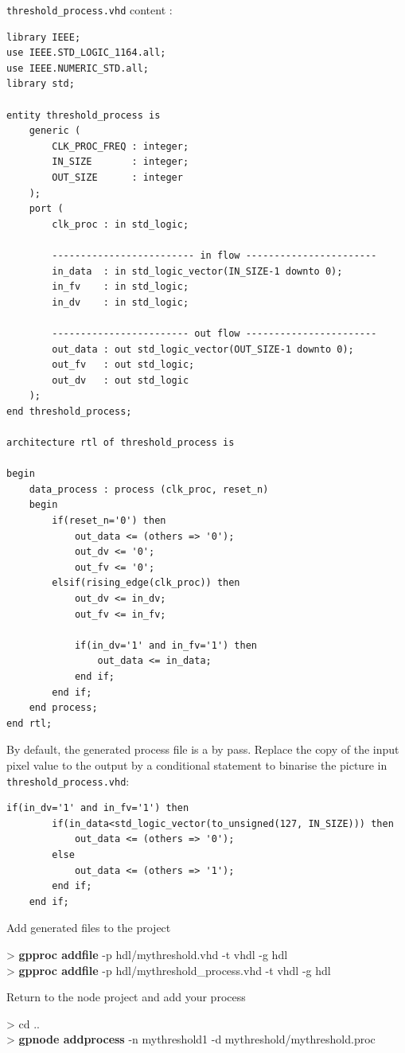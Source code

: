 \documentclass[10pt,a4paper]{article}
\begin{document}
\texttt{threshold\_process.vhd} content :
\begin{lstlisting}[frame=single]
library IEEE;
use IEEE.STD_LOGIC_1164.all;
use IEEE.NUMERIC_STD.all;
library std;

entity threshold_process is
	generic (
		CLK_PROC_FREQ : integer;
		IN_SIZE       : integer;
		OUT_SIZE      : integer
	);
	port (
		clk_proc : in std_logic;

		------------------------- in flow -----------------------
		in_data  : in std_logic_vector(IN_SIZE-1 downto 0);
		in_fv    : in std_logic;
		in_dv    : in std_logic;

		------------------------ out flow -----------------------
		out_data : out std_logic_vector(OUT_SIZE-1 downto 0);
		out_fv   : out std_logic;
		out_dv   : out std_logic
	);
end threshold_process;

architecture rtl of threshold_process is

begin
	data_process : process (clk_proc, reset_n)
	begin
		if(reset_n='0') then
			out_data <= (others => '0');
			out_dv <= '0';
			out_fv <= '0';
		elsif(rising_edge(clk_proc)) then
			out_dv <= in_dv;
			out_fv <= in_fv;

			if(in_dv='1' and in_fv='1') then
				out_data <= in_data;
			end if;
		end if;
	end process;
end rtl;
\end{lstlisting}

By default, the generated process file is a by pass. Replace the copy of the input pixel value to the output by a conditional statement to binarise the picture in \texttt{threshold\_process.vhd}:
\begin{lstlisting}[frame=single]
	if(in_dv='1' and in_fv='1') then
		if(in_data<std_logic_vector(to_unsigned(127, IN_SIZE))) then
			out_data <= (others => '0');
		else
			out_data <= (others => '1');
		end if;
	end if;
\end{lstlisting}

Add generated files to the project
\begin{sample}
> \textbf{gpproc addfile} -p hdl/mythreshold.vhd -t vhdl -g hdl \\
> \textbf{gpproc addfile} -p hdl/mythreshold\_process.vhd -t vhdl -g hdl
\end{sample}

Return to the node project and add your process
\begin{sample}
> cd .. \\
> \textbf{gpnode addprocess} -n mythreshold1 -d mythreshold/mythreshold.proc
\end{sample}
\end{document}
